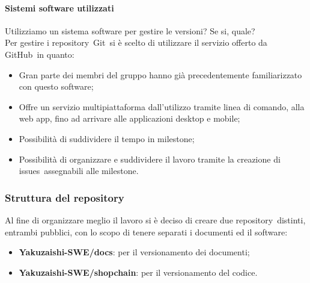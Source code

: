         \paragraph{Sistemi software utilizzati}
        Utilizziamo un sistema software per gestire le versioni? Se si, quale?\\

        Per gestire i repository\glo\ Git\glo\ si è scelto di utilizzare il servizio offerto da GitHub\glo\ in quanto:
        \begin{itemize}
            \item Gran parte dei membri del gruppo hanno già precedentemente familiarizzato con questo software;
            \item Offre un servizio multipiattaforma dall'utilizzo tramite linea di comando, alla web app, fino ad arrivare alle applicazioni desktop e mobile;
            \item Possibilità di suddividere il tempo in milestone\glo;
            \item Possibilità di organizzare e suddividere il lavoro tramite la creazione di issues\glo\ assegnabili alle milestone\glo.
        \end{itemize} 

    \subsubsection{Struttura del repository}
    Al fine di organizzare meglio il lavoro si è deciso di creare due repository\glo\ distinti, entrambi pubblici, con lo scopo di tenere separati i documenti ed il software:
    \begin{itemize}
        \item \textbf{Yakuzaishi-SWE/docs}: per il versionamento dei documenti;
        \item \textbf{Yakuzaishi-SWE/shopchain}: per il versionamento del codice.
    \end{itemize}

